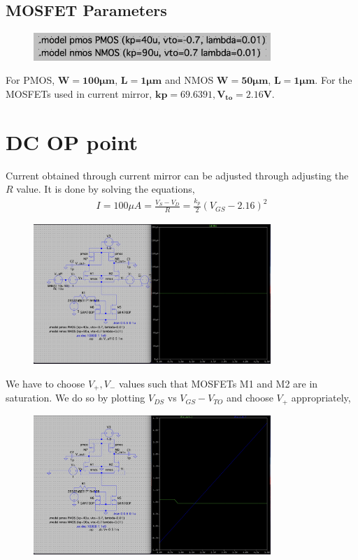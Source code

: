 \documentclass[12pt,a4paper]{article}
\begin{document}
\subsection{MOSFET Parameters}
\begin{figure}[ht!]
	\centering
	\includegraphics[width=0.8\textwidth]{Simluations/Experiment_4/figs/param.png}
\end{figure}
For PMOS, $\mathbf{W=100\mu m}$, $\mathbf{L=1\mu m}$ and NMOS $\mathbf{W=50\mu m}$, $\mathbf{L=1\mu m}$. For the MOSFETs used in current mirror, $\mathbf{kp=69.6391, V_{to}=2.16V}$.
\vspace{10pt}
\pagebreak
\section{DC OP point}
Current obtained through current mirror can be adjusted through adjusting the $R$ value. It is done by solving the equations,
\begin{align*}
    I = 100\mu A = \frac{V_S-V_D}{R} = \frac{k_p}{2}(V_{GS}-2.16)^2
\end{align*}
\begin{figure}[H]
    \centering
    \includegraphics[width=0.8\textwidth]{Simluations/Experiment_4/figs/current.png}
\end{figure}
We have to choose $V_+, V_-$ values such that MOSFETs M1 and M2 are in saturation. We do so by plotting $V_{DS}$ vs $V_{GS}-V_{TO}$ and choose $V_+$ appropriately,
\begin{figure}[H]
    \centering
    \includegraphics[width=0.8\textwidth]{Simluations/Experiment_4/figs/saturation_1.png}
\end{figure}
\end{document}
